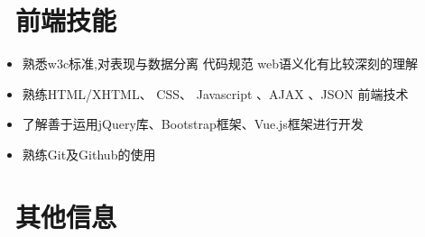 \documentclass{resume}
\begin{document}
%
%
%
%
%

\section{\faHeartO\ 前端技能}
\begin{itemize}
\item{熟悉w3c标准,对表现与数据分离 代码规范 web语义化有比较深刻的理解}
\item{熟练HTML/XHTML、 CSS、 Javascript 、AJAX 、JSON 前端技术 }
\item{了解善于运用jQuery库、Bootstrap框架、Vue.js框架进行开发}
\item{熟练Git及Github的使用}
\end{itemize}

\section{\faPaperPlane\ 其他信息}




%
%
\end{document}
